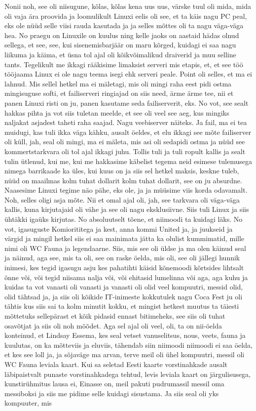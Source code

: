 Nonii noh, see oli niisugune, kõlas, kõlas kena uus uus, värske tuul oli mida, mida oli vaja ära proovida ja loomulikult Linuxi eelis oli see, et ta käis nagu PC peal, eks ole nüüd selle viisi rauda kasutada ja ja selles mõttes oli ta nagu väga-väga hea. No praegu on Linuxile on kuulus ning kelle jaoks on aastaid hädas olnud sellega, et see, see, kui sisenemisbarjäär on maru kõrged, kuidagi ei saa nagu liikuma ja käima, et üsna tol ajal oli kõikvõimalikud draiverid ja muu selline tants. Tegelikult me ikkagi rääkisime limaksist serveri mis etapis, et, et see töö tööjaama Linux ei ole nagu teema isegi ehk serveri peale. Point oli selles, et ma ei lahnud. Mis sellel hetkel ma ei mäletagi, mis oli mingi raha eest pidi ostma mingisuguse softi, et failiserveri ringiajad on siis need, ärme ärme tee, nii et panen Linuxi risti on ju, panen kasutame seda failiserverit, eks. No vot, see sealt hakkas pihta ja vot siis tuletan meelde, et see oli veel see aeg, kus mingiks naljakat asjadest taheti raha saajad. Nagu veebiserver näiteks. Ja fail, ma ei tea muidugi, kas tuli ikka väga kähku, ausalt öeldes, et elu ikkagi see mõte failiserver oli küll, jah, seal oli mingi, ma ei mäleta, mis asi oli sedapidi ostma ja nüüd see kommertstarkvara oli tol ajal ikkagi juhu. Tollis tuli ja tuli ropult kallis ja sealt tulin ütlenud, kui me, kui me hakkasime käbelist tegema neid esimese tulemusega nimega barrikaade ka üles, kui kuus on ja siis sel hetkel maksis, keskne tuleb, nüüd on maailmas kolm tuhat dollarit kolm tuhat dollarit, see on ju absurdne. Naasesime Linuxi tegime näo pähe, eks ole, ja ja müüsime viis korda odavamalt. Noh, selles oligi asja mõte. Nii et omal ajal oli, jah, see tarkvara oli väga-väga kallis, kuna kirjutajaid oli vähe ja see oli nagu eksklusiivne. Siis tuli Linux ja siis ühtäkki igaüks kirjutas. No absoluutselt tõene, et niimoodi ta kuidagi läks. No vot, igasuguste Komiorititega ja kest, anna kommi United ja, ja juukseid ja värgid ja mingil hetkel siis ei saa mainimata jätta ka olulist kummimatid, mille nimi oli WC Fauna ja legendaarne. Siis, mis see oli üldse ja ma olen käinud seal ja näinud, aga see, mis ta oli, see on raske öelda, mis oli, see oli jällegi hunnik inimesi, kes tegid igasugu asju kes pahatihti käisid kõnemoodi kõrtsides lihtsalt õnne või, või tegid niisama nalja või, või ehitasid lumelinna või aga, aga kuhu ja kuidas ta vot vanasti oli vanasti ja vanasti oli olid veel kompuutri, messid olid, olid tähtsad ja, ja siis oli kõikide IT-inimeste kokkutulek nagu Coca Fest ju oli tähtis kus siis sai ta kolm minutit kokku, et mingist hetkest muutus ta täiesti mõttetuks sellepärast et kõik pidasid ennast bitimeheks, see siis oli tuhat osavõtjat ja siis oli noh mõõdet. Aga sel ajal oli veel, oli, ta on nii-öelda konteinud, et Lindsay Essema, kes seal vetset vanuselitsus, nous, veets, fauna ja kuulutas, on ka mõtteviis ja eluviis, tähendab siin niimoodi niimoodi ei saa öelda, et kes see loll ja, ja sõjaväge ma arvan, terve meil oli ühel kompuutri, messil oli WC Fauna leviala kaart. Kui sa seletad Eesti kaarte vorstinahkade ausalt läbipaistvalt punaste vorstinahkadega tehtud, levis leviala kaart on järgulisusega, kunstirühmitus lausa ei, Einasse on, meil pakuti pudrumassil messil oma messiboksi ja siis me pidime selle kuidagi sisustama. Ja siis seal oli yks kompuuter, mis 